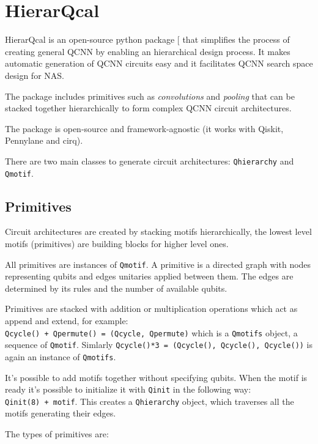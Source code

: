 \documentclass[
  13pt,
  a4paper,
  DIV=11,
  numbers=noendperiod]{scrreprt}
\begin{document}
\section{HierarQcal}\label{hierarqcal}

HierarQcal is an open-source python package
{[}\citeproc{ref-github_hierarqcal}{6}{]} that simplifies the process of
creating general QCNN by enabling an hierarchical design process. It
makes automatic generation of QCNN circuits easy and it facilitates QCNN
search space design for NAS.

The package includes primitives such as \emph{convolutions} and
\emph{pooling} that can be stacked together hierarchically to form
complex QCNN circuit architectures.

The package is open-source and framework-agnostic (it works with Qiskit,
Pennylane and cirq).

There are two main classes to generate circuit architectures:
\texttt{Qhierarchy} and \texttt{Qmotif}.

\subsection{Primitives}\label{primitives}

Circuit architectures are created by stacking motifs hierarchically, the
lowest level motifs (primitives) are building blocks for higher level
ones.

All primitives are instances of \texttt{Qmotif}. A primitive is a
directed graph with nodes representing qubits and edges unitaries
applied between them. The edges are determined by its rules and the
number of available qubits.

Primitives are stacked with addition or multiplication operations which
act as append and extend, for example:
\texttt{Qcycle()\ +\ Qpermute()\ =\ (Qcycle,\ Qpermute)} which is a
\texttt{Qmotifs} object, a sequence of \texttt{Qmotif}. Simlarly
\texttt{Qcycle()*3\ =\ (Qcycle(),\ Qcycle(),\ Qcycle())} is again an
instance of \texttt{Qmotifs}.

It's possible to add motifs together without specifying qubits. When the
motif is ready it's possible to initialize it with \texttt{Qinit} in the
following way: \texttt{Qinit(8)\ +\ motif}. This creates a
\texttt{Qhierarchy} object, which traverses all the motifs generating
their edges.

The types of primitives are:
\end{document}

